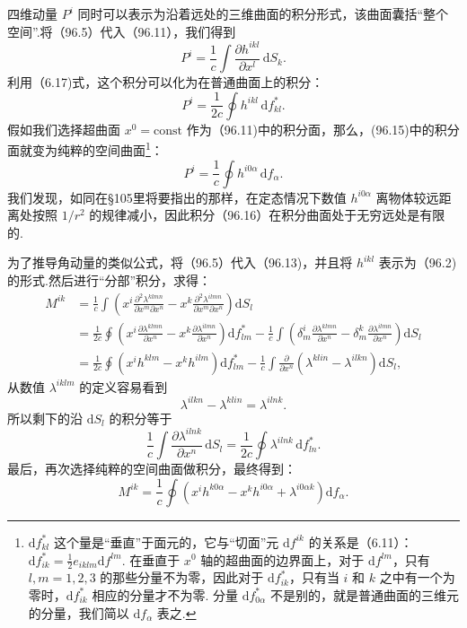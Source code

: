 四维动量 $P^i$ 同时可以表示为沿着远处的三维曲面的积分形式，该曲面囊括“整个空间”.将（96.5）代入（96.11），我们得到
\begin{equation*}
  P^i=\frac{1}{c}\int\frac{\partial h^{ikl}}{\partial x^l}\,\mathrm{d}S_k.
\end{equation*}
利用（6.17)式，这个积分可以化为在普通曲面上的积分：
\begin{equation}
  P^i=\frac{1}{2c}\oint h^{ikl}\,\mathrm{d}f^{*}_{kl}.
\end{equation}
假如我们选择超曲面 $x^0=\mathrm{const}$ 作为（96.11)中的积分面，那么，(96.15)中的积分面就变为纯粹的空间曲面\footnote{$\mathrm{d}f^{*}_{kl}$ 这个量是“垂直”于面元的，它与“切面”元 $\mathrm{d}f^{ik}$ 的关系是（6.11）：$\mathrm{d}f^{*}_{ik}=\frac{1}{2}e_{iklm}\mathrm{d}f^{lm}$. 在垂直于 $x^0$ 轴的超曲面的边界面上，对于 $\mathrm{d}f^{lm}$，只有 $l,m=1,2,3$ 的那些分量不为零，因此对于 $\mathrm{d}f^{*}_{ik}$，只有当 $i$ 和 $k$ 之中有一个为零时，$\mathrm{d}f^{*}_{ik}$ 相应的分量才不为零. 分量 $\mathrm{d}f^{*}_{0\alpha}$ 不是别的，就是普通曲面的三维元的分量，我们简以 $\mathrm{d}f_{\alpha}$ 表之.}：
\begin{equation}
  P^i=\frac{1}{c}\oint h^{i0\alpha}\,\mathrm{d}f_{\alpha}.
\end{equation}
我们发现，如同在§105里将要指出的那样，在定态情况下数值 $h^{i0\alpha}$ 离物体较远距离处按照 $1/r^2$ 的规律减小，因此积分（96.16）在积分曲面处于无穷远处是有限的.

为了推导角动量的类似公式，将（96.5）代入（96.13)，并且将 $h^{ikl}$ 表示为（96.2)的形式.然后进行“分部”积分，求得：
\begin{equation*}
\begin{aligned}
  M^{ik}&=\frac{1}{c}\int\left(x^i
  \frac{\partial^2\lambda^{klmn}}{\partial x^m\partial x^n}
  -x^k\frac{\partial^2\lambda^{ilmn}}{\partial x^m\partial x^n}\right)
  \mathrm{d}S_l\\
  &=\frac{1}{2c}\oint\left(x^i
  \frac{\partial\lambda^{klmn}}{\partial x^n}
  -x^k\frac{\partial\lambda^{ilmn}}{\partial x^n}\right)\mathrm{d}f^{*}_{lm}
  -\frac{1}{c}\int\left(\delta^i_m
  \frac{\partial\lambda^{klmn}}{\partial x^n}
  -\delta^k_m\frac{\partial\lambda^{ilmn}}{\partial x^n}\right)
  \mathrm{d}S_l\\
  &=\frac{1}{2c}\oint\left(x^ih^{klm}-x^kh^{ilm}\right)\mathrm{d}f^{*}_{lm}
  -\frac{1}{c}\int\frac{\partial}{\partial x^n}
  \left(\lambda^{klin}-\lambda^{ilkn}\right)\mathrm{d}S_l,
\end{aligned}
\end{equation*}
从数值 $\lambda^{iklm}$ 的定义容易看到
\begin{equation*}
  \lambda^{ilkn}-\lambda^{klin}=\lambda^{ilnk}.
\end{equation*}
所以剩下的沿 $\mathrm{d}S_l$ 的积分等于
\begin{equation*}
  \frac{1}{c}\int\frac{\partial\lambda^{ilnk}}{\partial x^n}\,\mathrm{d}S_l
  =\frac{1}{2c}\oint\lambda^{ilnk}\,\mathrm{d}f^{*}_{ln}.
\end{equation*}
最后，再次选择纯粹的空间曲面做积分，最终得到：
\begin{equation}
  M^{ik}=\frac{1}{c}\oint\left(x^ih^{k0\alpha}
  -x^kh^{i0\alpha}+\lambda^{i0\alpha k}\right)\mathrm{d}f_{\alpha}.
\end{equation}

